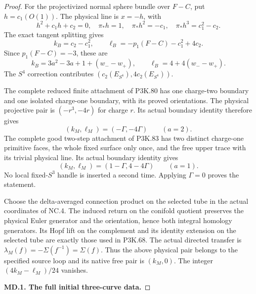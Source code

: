 \begin{proof}
For the projectivized normal sphere bundle over \(F-C\), put \(h=c_1(O(1))\). The physical line is \(x=-h\), with
\[
 h^2+c_1h+c_2=0,\quad \pi_*h=1,\quad
 \pi_*h^2=-c_1,\quad \pi_*h^3=c_1^2-c_2 .
\]
The exact tangent splitting gives
\[
 k_B=c_2-c_1^2,\qquad
 \ell_B=-p_1(F-C)-c_1^2+4c_2.
\]
Since \(p_1(F-C)=-3\), these are
\[
 k_B=3a^2-3a+1+(w_--w_+),\qquad
 \ell_B=4+4(w_--w_+).
\]
The \(S^4\) correction contributes
\((c_2(E_{S^4}),4c_2(E_{S^4}))\).

The complete reduced finite attachment of P3K.80 has one charge-two boundary and one isolated charge-one boundary, with its proved orientations. The physical projective pair is
\((-r^3,-4r)\) for charge \(r\). Its actual boundary identity therefore gives
\[
 (k_M,\ell_M)=(-\Gamma,-4\Gamma)\qquad(a=2).
\]
The complete good two-step attachment of P3K.83 has two distinct charge-one primitive faces, the whole fixed surface only once, and the free upper trace with its trivial physical line. Its actual boundary identity gives
\[
 (k_M,\ell_M)=(1-\Gamma,4-4\Gamma)\qquad(a=1).
\]
No local fixed-\(S^3\) handle is inserted a second time. Applying \(\Gamma=0\) proves the statement.

Choose the delta-averaged connection product on the selected tube in the actual coordinates of NC.4. The induced return on the conifold quotient preserves the physical Euler generator and the orientation, hence both integral homology generators. Its Hopf lift on the complement and its identity extension on the selected tube are exactly those used in P3K.68. The actual directed transfer is
\(\lambda_M(f)=-\Sigma(f^{-1})=\Sigma(f)\).
Thus the above physical pair belongs to the specified source loop and its native free pair is \((k_M,0)\). The integer \((4k_M-\ell_M)/24\) vanishes.

\par\medskip\noindent\textbf{MD.1. The full initial three-curve data.}\par\nopagebreak[4]


\end{proof}
